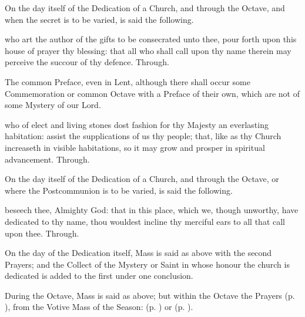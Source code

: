 \begin{inhead}
	On the day itself of the Dedication of a Church, and through the Octave, and when the secret is to be varied, is said the following.
\end{inhead}
 who art the author of the gifts to be consecrated unto thee, pour forth upon this house of prayer thy blessing: that all who shall call upon thy name therein may perceive the succour of thy defence. Through.

\begin{rubric}
	The common Preface, even in Lent, although there shall occur some Commemoration or common Octave with a Preface of their own, which are not of some Mystery of our Lord.
\end{rubric}


\postcommunion
{} who of elect and living stones dost fashion for thy Majesty an everlasting habitation: assist the supplications of us thy people; that, like as thy Church increaseth in visible habitations, so it may grow and prosper in spiritual advancement. Through.

\begin{rubric}
	On the day itself of the Dedication of a Church, and through the Octave, or where the Postcommunion is to be varied, is said the following.
\end{rubric}
 beseech thee, Almighty God: that in this place, which we, though unworthy, have dedicated to thy name, thou wouldest incline thy merciful ears to all that call upon thee. Through.

\begin{rubric}
	On the day of the Dedication itself, Mass is said as above with the second Prayers; and the Collect of the Mystery or Saint in whose honour the church is dedicated is added to the first under one conclusion.
\end{rubric}

\begin{rubric}
	During the Octave, Mass is said as above; but within the Octave the  Prayers  (p. \pageref{SPMaryInEaster}), from the Votive Mass of the Season:   (p. \pageref{SPAgainst}) or  (p. \pageref{SPChiefBishop}).
\end{rubric}

